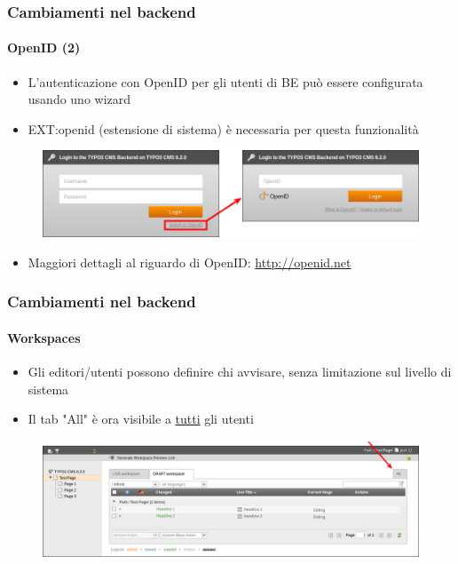 
\begin{frame}[fragile]
	\frametitle{Cambiamenti nel backend}
	\framesubtitle{OpenID (2)}

 	\begin{itemize}
		\item L'autenticazione con OpenID per gli utenti di BE può essere configurata usando uno wizard
		\item EXT:openid (estensione di sistema) è necessaria per questa funzionalità
	\end{itemize}

	\begin{figure}
		\includegraphics[width=0.8\linewidth]{Images/BackendChanges/OpenIdLogin.png}
	\end{figure}

 	\begin{itemize}
		\item Maggiori dettagli al riguardo di OpenID:\newline
			\small\url{http://openid.net}\normalsize
	\end{itemize}

\end{frame}


\begin{frame}[fragile]
	\frametitle{Cambiamenti nel backend}
	\framesubtitle{Workspaces}

 	\begin{itemize}
		\item Gli editori/utenti possono definire chi avvisare, senza limitazione sul livello di sistema
		\item Il tab "All" è ora visibile a \underline{tutti} gli utenti
	\end{itemize}

	\begin{figure}
		\includegraphics[width=0.95\linewidth]{Images/BackendChanges/WorkspacesTabAll.png}
	\end{figure}

\end{frame}


